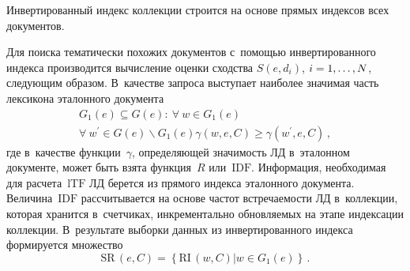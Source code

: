 \begin{multicols}{2}
  Инвертированный индекс коллекции строится на основе прямых индексов 
всех документов.
  
  Для поиска тематически похожих документов с~помощью инвертированного 
индекса производится вычисление оценки сходства $S(e,d_i)$, $i\hm=1,\ldots ,
N$, следующим образом. В~качестве запроса выступает наиболее значимая 
часть лексикона эталонного документа
  \begin{multline*}
  G_1(e)\subseteq G(e):\ \forall\ w\in G_1(e)\\
  \forall\ w^\prime \in G(e)\backslash G_1(e)\gamma(w,e,C)\geq 
\gamma\left(w^\prime,e, C\right)\,,
  \end{multline*}
где в~качестве функции~$\gamma$, определяющей значимость ЛД в~эталонном 
документе, может быть взята функция~$R$ или~$\mathrm{IDF}$. Информация, 
необходимая для расчета~$\mathrm{lTF}$ ЛД берется из прямого индекса эталонного 
документа. Величина~$\mathrm{IDF}$ рассчитывается на основе частот встречаемости 
ЛД в~коллекции, которая хранится в~счетчиках, инкрементально обновляемых 
на этапе индексации коллекции. В~результате выборки данных из 
инвертированного индекса формируется множество 
$$
\mathrm{SR}\,(e,C)= 
\left\{\mathrm{RI}\,(w,C)\vert w\in G_1(e)\right\}\,.
$$


\end{multicols}

